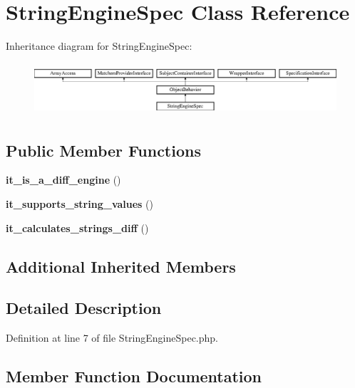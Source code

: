 \section{String\+Engine\+Spec Class Reference}
\label{classspec_1_1_php_spec_1_1_formatter_1_1_presenter_1_1_differ_1_1_string_engine_spec}
Inheritance diagram for String\+Engine\+Spec\+:\begin{figure}[H]
\begin{center}
\leavevmode
\includegraphics[height=1.953488cm]{classspec_1_1_php_spec_1_1_formatter_1_1_presenter_1_1_differ_1_1_string_engine_spec}
\end{center}
\end{figure}
\subsection*{Public Member Functions}
\begin{DoxyCompactItemize}
\item 
{\bf it\+\_\+is\+\_\+a\+\_\+diff\+\_\+engine} ()
\item 
{\bf it\+\_\+supports\+\_\+string\+\_\+values} ()
\item 
{\bf it\+\_\+calculates\+\_\+strings\+\_\+diff} ()
\end{DoxyCompactItemize}
\subsection*{Additional Inherited Members}


\subsection{Detailed Description}


Definition at line 7 of file String\+Engine\+Spec.\+php.



\subsection{Member Function Documentation}
